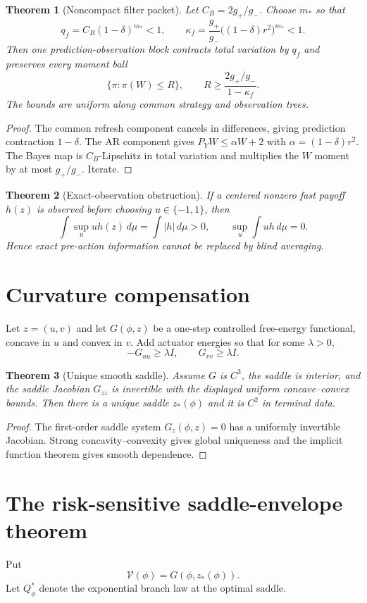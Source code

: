 \documentclass[11pt,reqno]{amsart}
\newtheorem{theorem}{Theorem}[section]
\theoremstyle{remark}
\newcommand{\abs}[1]{\left\lvert #1\right\rvert}
\begin{document}
\begin{theorem}[Noncompact filter packet]\label{thm:filter}
Let $C_B=2g_+/g_-$.  Choose $m_*$ so that
\[
 q_f=C_B(1-\delta)^{m_*}<1,
 \qquad
 \kappa_f=\frac{g_+}{g_-}\bigl((1-\delta)r^2\bigr)^{m_*}<1.
\]
Then one prediction-observation block contracts total variation by $q_f$ and
preserves every moment ball
\[
 \{\pi:\pi(W)\le R\},\qquad
 R\ge\frac{2g_+/g_-}{1-\kappa_f}.
\]
The bounds are uniform along common strategy and observation trees.
\end{theorem}
\begin{proof}
The common refresh component cancels in differences, giving prediction
contraction $1-\delta$.  The AR component gives
$P_YW\le\alpha W+2$ with $\alpha=(1-\delta)r^2$.  The Bayes map is
$C_B$-Lipschitz in total variation and multiplies the $W$ moment by at most
$g_+/g_-$.  Iterate.
\end{proof}

\begin{theorem}[Exact-observation obstruction]\label{thm:no-go}
If a centered nonzero fast payoff $h(z)$ is observed before choosing
$u\in\{-1,1\}$, then
\[
 \int\sup_u uh(z)\,d\mu=\int\abs h\,d\mu>0,
 \qquad
 \sup_u\int uh\,d\mu=0.
\]
Hence exact pre-action information cannot be replaced by blind averaging.
\end{theorem}

\section{Curvature compensation}
Let $z=(u,v)$ and let $G(\phi,z)$ be a one-step controlled free-energy
functional, concave in $u$ and convex in $v$.  Add actuator energies so that
for some $\lambda>0$,
\[
 -G_{uu}\ge\lambda I,
 \qquad G_{vv}\ge\lambda I.
\]

\begin{theorem}[Unique smooth saddle]\label{thm:saddle}
Assume $G$ is $C^3$, the saddle is interior, and the saddle Jacobian
$G_{zz}$ is invertible with the displayed uniform concave--convex bounds.
Then there is a unique saddle $z_*(\phi)$ and it is $C^2$ in terminal data.
\end{theorem}
\begin{proof}
The first-order saddle system $G_z(\phi,z)=0$ has a uniformly invertible
Jacobian.  Strong concavity--convexity gives global uniqueness and the implicit
function theorem gives smooth dependence.
\end{proof}

\section{The risk-sensitive saddle-envelope theorem}
Put
\[
 \mathcal V(\phi)=G(\phi,z_*(\phi)).
\]
Let $Q_\phi^*$ denote the exponential branch law at the optimal saddle.
\end{document}
